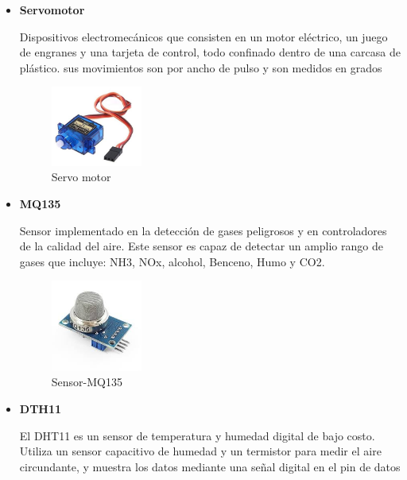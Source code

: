 \documentclass[letterpaper,12pt]{article}
\begin{document}
{\begin{itemize}
\begin{figure}[h]
			\end{figure}

			\item \textbf{Servomotor}
			
			Dispositivos electromecánicos que consisten en un motor eléctrico, un juego de engranes y una tarjeta de control, todo confinado dentro de una carcasa de plástico. sus movimientos son por ancho de pulso y son medidos en grados
			
			\begin{figure}[h]
				\centering
				\begin{minipage}[t]{5cm}
					\includegraphics[width=3cm]{images/servo.jpg}	 %
					\caption{ Servo motor}
				\end{minipage}
				
			\end{figure}
			
			
			\item \textbf{MQ135}
			
			Sensor implementado en la detección de gases peligrosos y en controladores de la calidad del aire. Este sensor es capaz de detectar un amplio rango de gases que incluye: NH3, NOx, alcohol, Benceno, Humo y CO2.
			
			\begin{figure}[h]
				\centering
				\begin{minipage}[t]{5cm}
					\includegraphics[width=3cm]{images/mq135.jpeg}	 %
					\caption{Sensor-MQ135 }
				\end{minipage}
				
			\end{figure}
			
			\newpage
			\item \textbf{DTH11}
			
			El DHT11 es un sensor de temperatura y humedad digital de bajo costo. Utiliza un sensor capacitivo de humedad y un termistor para medir el aire circundante, y muestra los datos mediante una señal digital en el pin de datos 
			

\end{itemize}}
\end{document}

